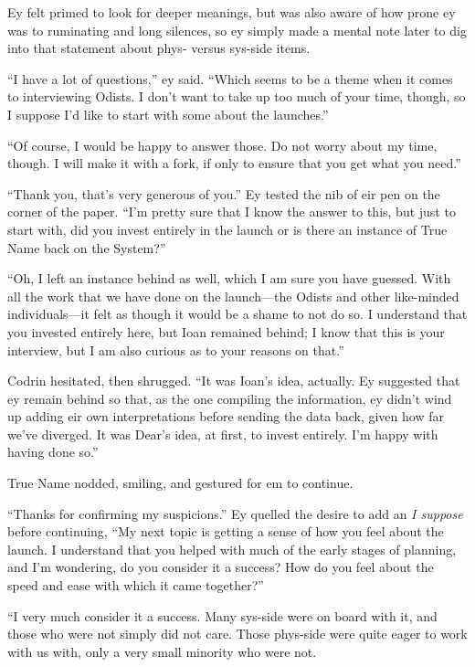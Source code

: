 Ey felt primed to look for deeper meanings, but was also aware of how prone ey was to ruminating and long silences, so ey simply made a mental note later to dig into that statement about phys- versus sys-side items.

``I have a lot of questions,'' ey said. ``Which seems to be a theme when it comes to interviewing Odists. I don't want to take up too much of your time, though, so I suppose I'd like to start with some about the launches.''

``Of course, I would be happy to answer those. Do not worry about my time, though. I will make it with a fork, if only to ensure that you get what you need.''

``Thank you, that's very generous of you.'' Ey tested the nib of eir pen on the corner of the paper. ``I'm pretty sure that I know the answer to this, but just to start with, did you invest entirely in the launch or is there an instance of True Name back on the System?''

``Oh, I left an instance behind as well, which I am sure you have guessed. With all the work that we have done on the launch---the Odists and other like-minded individuals---it felt as though it would be a shame to not do so. I understand that you invested entirely here, but Ioan remained behind; I know that this is your interview, but I am also curious as to your reasons on that.''

Codrin hesitated, then shrugged. ``It was Ioan's idea, actually. Ey suggested that ey remain behind so that, as the one compiling the information, ey didn't wind up adding eir own interpretations before sending the data back, given how far we've diverged. It was Dear's idea, at first, to invest entirely. I'm happy with having done so.''

True Name nodded, smiling, and gestured for em to continue.

``Thanks for confirming my suspicions.'' Ey quelled the desire to add an \emph{I suppose} before continuing, ``My next topic is getting a sense of how you feel about the launch. I understand that you helped with much of the early stages of planning, and I'm wondering, do you consider it a success? How do you feel about the speed and ease with which it came together?''

``I very much consider it a success. Many sys-side were on board with it, and those who were not simply did not care. Those phys-side were quite eager to work with us with, only a very small minority who were not.

